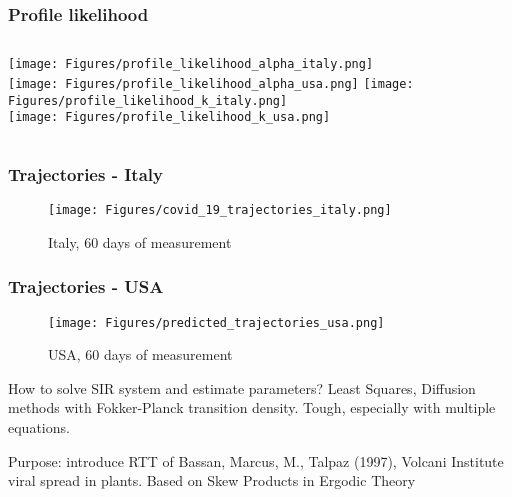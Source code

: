 \documentclass[notes]{beamer}
\begin{document}
\begin{frame}
\frametitle{Profile likelihood}
\begin{columns}[t]
        \centering
        \texttt{[image: Figures/profile\_likelihood\_alpha\_italy.png]}
        \\
        \texttt{[image: Figures/profile\_likelihood\_alpha\_usa.png]}
        \centering
        \texttt{[image: Figures/profile\_likelihood\_k\_italy.png]}
        \\
        \texttt{[image: Figures/profile\_likelihood\_k\_usa.png]}
\end{columns}
\end{frame}
\begin{frame}
\frametitle{Trajectories - Italy}
\begin{figure}
    \centering
    \texttt{[image: Figures/covid\_19\_trajectories\_italy.png]}
    \caption{Italy, 60 days of measurement}
    \label{fig:italy_covid_19_trajectories}
\end{figure}
\end{frame}
\begin{frame}
\frametitle{Trajectories - USA}
\begin{figure}
    \centering
    \texttt{[image: Figures/predicted\_trajectories\_usa.png]}
    \caption{USA, 60 days of measurement}
    \label{fig:usa_covid_19_trajectories}
\end{figure}
\end{frame}
\begin{frame}
\noindent How to solve SIR system and estimate parameters? Least Squares, Diffusion methods with Fokker-Planck transition density. Tough, especially with multiple equations.

\bigskip

Purpose: introduce RTT of Bassan, Marcus, M., Talpaz (1997), Volcani
Institute viral spread in plants. Based on Skew Products in Ergodic Theory
\end{frame}
\end{document}
